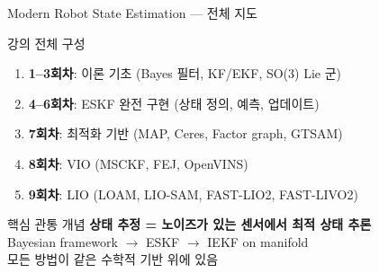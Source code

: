 \begin{frame}{Modern Robot State Estimation — 전체 지도}
  \begin{block}{강의 전체 구성}
    \begin{enumerate}
      \item \textbf{1--3회차}: 이론 기초 (Bayes 필터, KF/EKF, SO(3) Lie 군)
      \item \textbf{4--6회차}: ESKF 완전 구현 (상태 정의, 예측, 업데이트)
      \item \textbf{7회차}: 최적화 기반 (MAP, Ceres, Factor graph, GTSAM)
      \item \textbf{8회차}: VIO (MSCKF, FEJ, OpenVINS)
      \item \textbf{9회차}: LIO (LOAM, LIO-SAM, FAST-LIO2, FAST-LIVO2)
    \end{enumerate}
  \end{block}
  \pause
  \begin{alertblock}{핵심 관통 개념}
    \textbf{상태 추정 = 노이즈가 있는 센서에서 최적 상태 추론}\\
    Bayesian framework $\to$ ESKF $\to$ IEKF on manifold\\
    모든 방법이 같은 수학적 기반 위에 있음
  \end{alertblock}
\end{frame}

